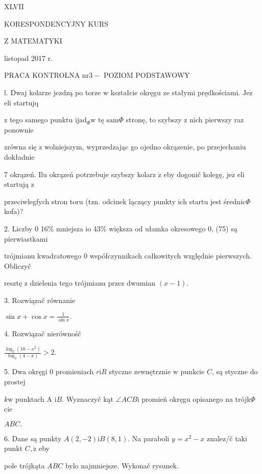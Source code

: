 \documentclass[a4paper,12pt]{article}
\begin{document}
XLVII

KORESPONDENCYJNY KURS

Z MATEMATYKI

listopad 2017 r.

PRACA KONTROLNA $\mathrm{n}\mathrm{r} 3-$ POZIOM PODSTAWOWY

l. Dwaj kolarze jezdzą po torze $\mathrm{w}$ kształcie okręgu ze stałymi prędkościami. $\mathrm{J}\mathrm{e}\dot{\mathrm{z}}$ eli startujq

$\mathrm{z}$ tego samego punktu $\mathrm{i}\mathrm{j}\mathrm{a}\mathrm{d}_{\Phi}\mathrm{w}$ tę $\mathrm{s}\mathrm{a}\mathrm{m}\Phi$ stronę, to szybszy $\mathrm{z}$ nich pierwszy raz ponownie

zrówna się $\mathrm{z}$ wolniejszym, wyprzedzając go ojedno okrązenie, po przejechaniu dokładnie

7 okrązeń. Ilu okrązeń potrzebuje szybszy kolarz $\dot{\mathrm{z}}$ eby dogonič kolegę, $\mathrm{j}\mathrm{e}\dot{\mathrm{z}}$ eli startują $\mathrm{z}$

przeciwlegfych stron toru (tzn. odcinek lączący punkty ich startu jest średnic$\Phi$ kofa)?

2. Liczby $0$ 16\% mniejsza $\mathrm{i}\mathrm{o}$ 43\% większa od ułamka okresowego 0, (75) są pierwiastkami

trójmianu kwadratowego $0$ wspófczynnikach całkowitych względnie pierwszych. Obliczyč

resztę $\mathrm{z}$ dzielenia tego trójmianu przez dwumian $(x-1).$

3. Rozwiązač równanie

$\displaystyle \sin x+\cos x=\frac{1}{\sin x}.$

4. Rozwiązač nierównośč

$\displaystyle \frac{\log_{2}(10-x^{2})}{\log_{2}(4-x)}>2.$

5. Dwa okręgi $0$ promieniach $r\mathrm{i}R$ styczne zewnętrznie $\mathrm{w}$ punkcie $C$, są styczne do prostej

$k\mathrm{w}$ punktach A $\mathrm{i}B$. Wyznaczyč kąt $\angle ACB\mathrm{i}$ promień okręgu opisanego na trójk$\Phi$cie

$ABC.$

6. Dane są punkty $A(2,-2)\mathrm{i}B(8,1)$. Na paraboli $y=x^{2}-x$ znalez/č taki punkt $C, \dot{\mathrm{z}}$ eby

pole trójkąta $ABC$ bylo najmniejsze. Wykonač rysunek.
\end{document}
